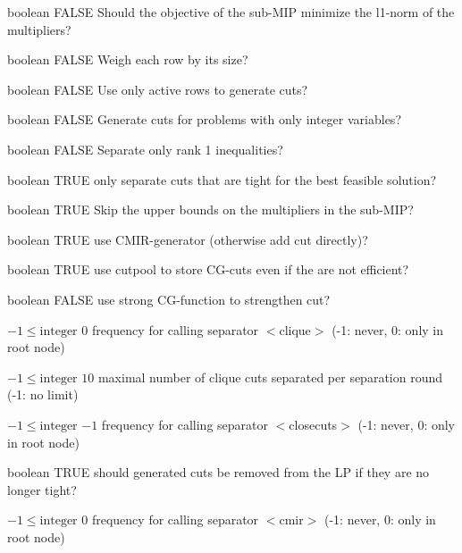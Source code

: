 %
{boolean}%
{FALSE}%
{Should the objective of the sub-MIP minimize the l1-norm of the multipliers?}%
{}

%
{boolean}%
{FALSE}%
{Weigh each row by its size?}%
{}

%
{boolean}%
{FALSE}%
{Use only active rows to generate cuts?}%
{}

%
{boolean}%
{FALSE}%
{Generate cuts for problems with only integer variables?}%
{}

%
{boolean}%
{FALSE}%
{Separate only rank 1 inequalities?}%
{}

%
{boolean}%
{TRUE}%
{only separate cuts that are tight for the best feasible solution?}%
{}

%
{boolean}%
{TRUE}%
{Skip the upper bounds on the multipliers in the sub-MIP?}%
{}

%
{boolean}%
{TRUE}%
{use CMIR-generator (otherwise add cut directly)?}%
{}

%
{boolean}%
{TRUE}%
{use cutpool to store CG-cuts even if the are not efficient?}%
{}

%
{boolean}%
{FALSE}%
{use strong CG-function to strengthen cut?}%
{}

%
{$-1\leq\textrm{integer}$}%
{$0$}%
{frequency for calling separator $<$clique$>$ (-1: never, 0: only in root node)}%
{}

%
{$-1\leq\textrm{integer}$}%
{$10$}%
{maximal number of clique cuts separated per separation round (-1: no limit)}%
{}

%
{$-1\leq\textrm{integer}$}%
{$-1$}%
{frequency for calling separator $<$closecuts$>$ (-1: never, 0: only in root node)}%
{}

%
{boolean}%
{TRUE}%
{should generated cuts be removed from the LP if they are no longer tight?}%
{}

%
{$-1\leq\textrm{integer}$}%
{$0$}%
{frequency for calling separator $<$cmir$>$ (-1: never, 0: only in root node)}%
{}

